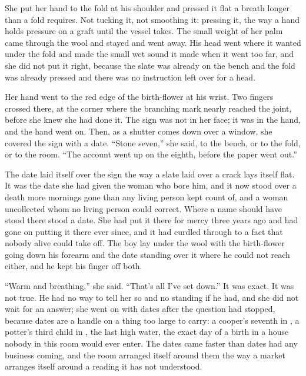 She put her hand to the fold at his shoulder and pressed it flat a breath longer than a fold requires. Not tucking it, not smoothing it: pressing it, the way a hand holds pressure on a graft until the vessel takes. The small weight of her palm came through the wool and stayed and went away. His head went where it wanted under the fold and made the small wet sound it made when it went too far, and she did not put it right, because the slate was already on the bench and the fold was already pressed and there was no instruction left over for a head.

Her hand went to the red edge of the birth-flower at his wrist. Two fingers crossed there, at the corner where the branching mark nearly reached the joint, before she knew she had done it. The sign was not in her face; it was in the hand, and the hand went on. Then, as a shutter comes down over a window, she covered the sign with a date. “Stone seven,” she said, to the bench, or to the fold, or to the room. “The account went up on the eighth, before the paper went out.”

The date laid itself over the sign the way a slate laid over a crack lays itself flat. It was the date she had given the woman who bore him, and it now stood over a death more mornings gone than any living person kept count of, and a woman uncollected whom no living person could correct. Where a name should have stood there stood a date. She had put it there for mercy three years ago and had gone on putting it there ever since, and it had curdled through to a fact that nobody alive could take off. The boy lay under the wool with the birth-flower going down his forearm and the date standing over it where he could not reach either, and he kept his finger off both.

“Warm and breathing,” she said. “That's all I've set down.” It was exact. It was not true. He had no way to tell her so and no standing if he had, and she did not wait for an answer; she went on with dates after the question had stopped, because dates are a handle on a thing too large to carry: a cooper's seventh in , a potter's third child in , the last high water, the exact day of a birth in a house nobody in this room would ever enter. The dates came faster than dates had any business coming, and the room arranged itself around them the way a market arranges itself around a reading it has not understood.

